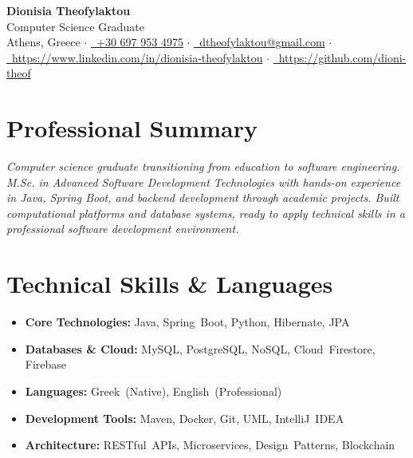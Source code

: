 \documentclass[a4paper,10pt]{article}
\begin{document}
\begin{center}
    {\Huge\bfseries\color{primary} Dionisia Theofylaktou}\\[0.2em]
    {\large\color{secondary} Computer Science Graduate}\\[0.3em]
    \textcolor{secondary}{
        Athens, Greece $\cdot$
        \href{tel:+306979534975}{\faPhone\ +30 697 953 4975} $\cdot$
        \href{mailto:dtheofylaktou@gmail.com}{\faEnvelope\ dtheofylaktou@gmail.com} $\cdot$
        \href{https://www.linkedin.com/in/dionisia-theofylaktou/}{\faLinkedin\ https://www.linkedin.com/in/dionisia-theofylaktou} $\cdot$
        \href{https://github.com/dioni-theof}{\faGithub\ https://github.com/dioni-theof}
    }
\end{center}

\vspace{-0.1em}

\section*{Professional Summary}
\textit{Computer science graduate transitioning from education to software engineering. M.Sc. in Advanced Software Development Technologies with hands-on experience in Java, Spring Boot, and backend development through academic projects. Built computational platforms and database systems, ready to apply technical skills in a professional software development environment.}

\section*{Technical Skills \& Languages}
\noindent
\begin{minipage}[t]{0.49\textwidth}
\begin{itemize}[leftmargin=*, noitemsep, topsep=0pt, parsep=1pt, partopsep=0pt]
    \item \textbf{\textcolor{primary}{Core Technologies:}} Java, Spring~Boot, Python, Hibernate, JPA
    \item \textbf{\textcolor{primary}{Databases \& Cloud:}} MySQL, PostgreSQL, NoSQL, Cloud~Firestore, Firebase
    \item \textbf{\textcolor{primary}{Languages:}} Greek~(Native), English~(Professional)
\end{itemize}
\end{minipage}\hfill
\begin{minipage}[t]{0.49\textwidth}
\begin{itemize}[leftmargin=*, noitemsep, topsep=0pt, parsep=1pt, partopsep=0pt]
    \item \textbf{\textcolor{primary}{Development Tools:}} Maven, Docker, Git, UML, IntelliJ~IDEA
    \item \textbf{\textcolor{primary}{Architecture:}} RESTful~APIs, Microservices, Design~Patterns, Blockchain
\end{itemize}
\end{minipage}
\end{document}
